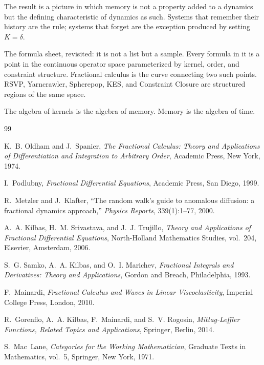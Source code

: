 \documentclass[12pt]{article}
\begin{document}
The result is a picture in which memory is not a property added to a
dynamics but the defining characteristic of dynamics as such. Systems
that remember their history are the rule; systems that forget are the
exception produced by setting $K = \delta$.

The formula sheet, revisited: it is not a list but a sample. Every
formula in it is a point in the continuous operator space parameterized
by kernel, order, and constraint structure. Fractional calculus is the
curve connecting two such points. RSVP, Yarncrawler, Spherepop, KES,
and Constraint Closure are structured regions of the same space.

The algebra of kernels is the algebra of memory. Memory is the algebra
of time.

\begin{thebibliography}{99}

K.~B. Oldham and J.~Spanier,
\textit{The Fractional Calculus: Theory and Applications of
Differentiation and Integration to Arbitrary Order},
Academic Press, New York, 1974.

I.~Podlubny,
\textit{Fractional Differential Equations},
Academic Press, San Diego, 1999.

R.~Metzler and J.~Klafter,
``The random walk's guide to anomalous diffusion: a fractional
dynamics approach,''
\textit{Physics Reports}, 339(1):1--77, 2000.

A.~A. Kilbas, H.~M. Srivastava, and J.~J. Trujillo,
\textit{Theory and Applications of Fractional Differential Equations},
North-Holland Mathematics Studies, vol.~204,
Elsevier, Amsterdam, 2006.

S.~G. Samko, A.~A. Kilbas, and O.~I. Marichev,
\textit{Fractional Integrals and Derivatives: Theory and Applications},
Gordon and Breach, Philadelphia, 1993.

F.~Mainardi,
\textit{Fractional Calculus and Waves in Linear Viscoelasticity},
Imperial College Press, London, 2010.

R.~Gorenflo, A.~A. Kilbas, F.~Mainardi, and S.~V. Rogosin,
\textit{Mittag-Leffler Functions, Related Topics and Applications},
Springer, Berlin, 2014.

S.~Mac~Lane,
\textit{Categories for the Working Mathematician},
Graduate Texts in Mathematics, vol.~5,
Springer, New York, 1971.


\end{thebibliography}
\end{document}
